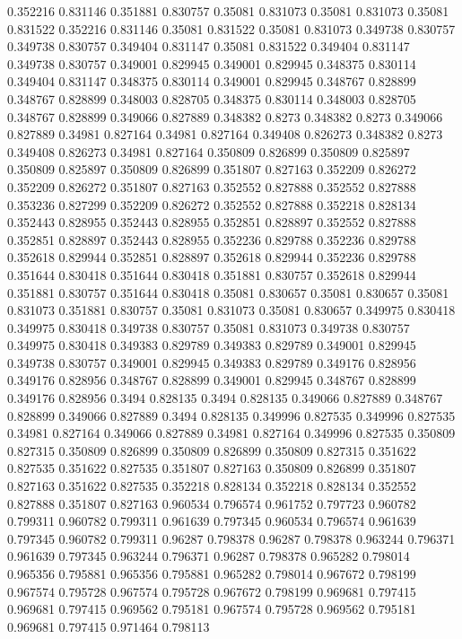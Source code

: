 0.352216 0.831146
0.351881 0.830757
0.35081 0.831073
0.35081 0.831073
0.35081 0.831522
0.352216 0.831146
0.35081 0.831522
0.35081 0.831073
0.349738 0.830757
0.349738 0.830757
0.349404 0.831147
0.35081 0.831522
0.349404 0.831147
0.349738 0.830757
0.349001 0.829945
0.349001 0.829945
0.348375 0.830114
0.349404 0.831147
0.348375 0.830114
0.349001 0.829945
0.348767 0.828899
0.348767 0.828899
0.348003 0.828705
0.348375 0.830114
0.348003 0.828705
0.348767 0.828899
0.349066 0.827889
0.348382 0.8273
0.348382 0.8273
0.349066 0.827889
0.34981 0.827164
0.34981 0.827164
0.349408 0.826273
0.348382 0.8273
0.349408 0.826273
0.34981 0.827164
0.350809 0.826899
0.350809 0.825897
0.350809 0.825897
0.350809 0.826899
0.351807 0.827163
0.352209 0.826272
0.352209 0.826272
0.351807 0.827163
0.352552 0.827888
0.352552 0.827888
0.353236 0.827299
0.352209 0.826272
0.352552 0.827888
0.352218 0.828134
0.352443 0.828955
0.352443 0.828955
0.352851 0.828897
0.352552 0.827888
0.352851 0.828897
0.352443 0.828955
0.352236 0.829788
0.352236 0.829788
0.352618 0.829944
0.352851 0.828897
0.352618 0.829944
0.352236 0.829788
0.351644 0.830418
0.351644 0.830418
0.351881 0.830757
0.352618 0.829944
0.351881 0.830757
0.351644 0.830418
0.35081 0.830657
0.35081 0.830657
0.35081 0.831073
0.351881 0.830757
0.35081 0.831073
0.35081 0.830657
0.349975 0.830418
0.349975 0.830418
0.349738 0.830757
0.35081 0.831073
0.349738 0.830757
0.349975 0.830418
0.349383 0.829789
0.349383 0.829789
0.349001 0.829945
0.349738 0.830757
0.349001 0.829945
0.349383 0.829789
0.349176 0.828956
0.349176 0.828956
0.348767 0.828899
0.349001 0.829945
0.348767 0.828899
0.349176 0.828956
0.3494 0.828135
0.3494 0.828135
0.349066 0.827889
0.348767 0.828899
0.349066 0.827889
0.3494 0.828135
0.349996 0.827535
0.349996 0.827535
0.34981 0.827164
0.349066 0.827889
0.34981 0.827164
0.349996 0.827535
0.350809 0.827315
0.350809 0.826899
0.350809 0.826899
0.350809 0.827315
0.351622 0.827535
0.351622 0.827535
0.351807 0.827163
0.350809 0.826899
0.351807 0.827163
0.351622 0.827535
0.352218 0.828134
0.352218 0.828134
0.352552 0.827888
0.351807 0.827163
0.960534 0.796574
0.961752 0.797723
0.960782 0.799311
0.960782 0.799311
0.961639 0.797345
0.960534 0.796574
0.961639 0.797345
0.960782 0.799311
0.96287 0.798378
0.96287 0.798378
0.963244 0.796371
0.961639 0.797345
0.963244 0.796371
0.96287 0.798378
0.965282 0.798014
0.965356 0.795881
0.965356 0.795881
0.965282 0.798014
0.967672 0.798199
0.967574 0.795728
0.967574 0.795728
0.967672 0.798199
0.969681 0.797415
0.969681 0.797415
0.969562 0.795181
0.967574 0.795728
0.969562 0.795181
0.969681 0.797415
0.971464 0.798113
